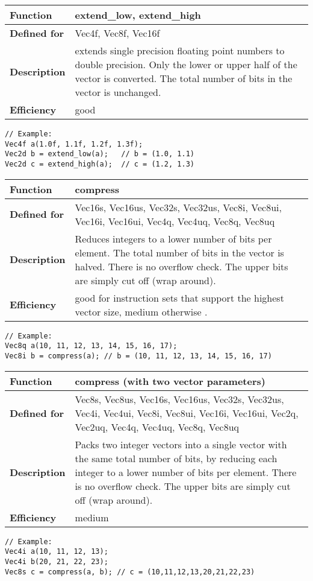 \documentclass[vcl_manual.tex]{subfiles}
\begin{document}
\begin{tabular}{|p{30mm}|p{120mm}|}
\hline
\bfseries Function & extend\_low, extend\_high \\ \hline
\bfseries Defined for & Vec4f, Vec8f, Vec16f \\ \hline
\bfseries Description & extends single precision floating point numbers to double precision. 
Only the lower or upper half of the vector is converted. The total number of bits in the vector is unchanged.  \\ \hline
\bfseries Efficiency & good \\ \hline
\end{tabular}
\begin{lstlisting}[frame=none]
// Example:
Vec4f a(1.0f, 1.1f, 1.2f, 1.3f);
Vec2d b = extend_low(a);   // b = (1.0, 1.1)
Vec2d c = extend_high(a);  // c = (1.2, 1.3)
\end{lstlisting}


\begin{tabular}{|p{30mm}|p{120mm}|}
\hline
\bfseries Function & compress \\ \hline
\bfseries Defined for & Vec16s, Vec16us, Vec32s, Vec32us, 
Vec8i, Vec8ui, Vec16i, Vec16ui,  
Vec4q, Vec4uq, Vec8q, Vec8uq \\ \hline
\bfseries Description & Reduces integers to a lower number of bits per element. 
The total number of bits in the vector is halved. 
There is no overflow check. The upper bits are simply cut off (wrap around). \\ \hline
\bfseries Efficiency & good for instruction sets that support the highest vector size, medium otherwise . \\ \hline
\end{tabular}
\begin{lstlisting}[frame=none]
// Example:
Vec8q a(10, 11, 12, 13, 14, 15, 16, 17);
Vec8i b = compress(a); // b = (10, 11, 12, 13, 14, 15, 16, 17)
\end{lstlisting}


\begin{tabular}{|p{30mm}|p{120mm}|}
\hline
\bfseries Function & compress (with two vector parameters) \\ \hline
\bfseries Defined for & Vec8s, Vec8us, Vec16s, Vec16us, Vec32s, Vec32us, 
Vec4i, Vec4ui, Vec8i, Vec8ui, Vec16i, Vec16ui,  
Vec2q, Vec2uq, Vec4q, Vec4uq, Vec8q, Vec8uq \\ \hline
\bfseries Description & Packs two integer vectors into a single vector with the same total number of bits, by reducing each integer to a lower number of bits per element. 
There is no overflow check. The upper bits are simply cut off (wrap around). \\ \hline
\bfseries Efficiency & medium \\ \hline
\end{tabular}
\begin{lstlisting}[frame=none]
// Example:
Vec4i a(10, 11, 12, 13);
Vec4i b(20, 21, 22, 23);
Vec8s c = compress(a, b); // c = (10,11,12,13,20,21,22,23)
\end{lstlisting}
\end{document}
